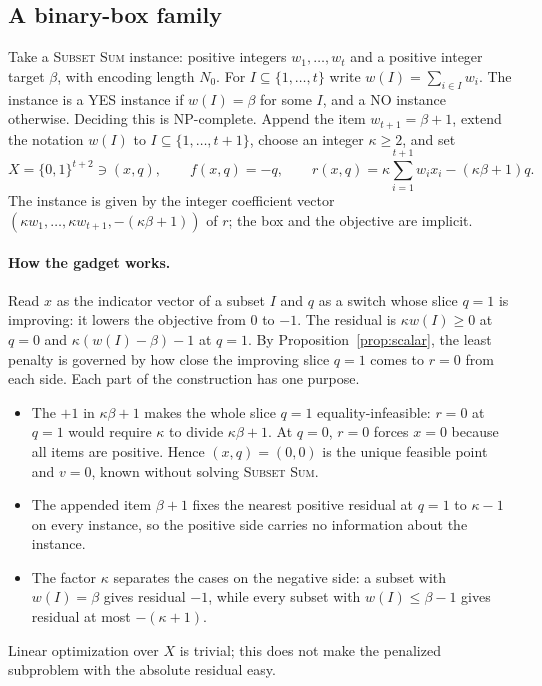 \subsection{A binary-box family}\label{sec:calibration-family}
Take a \textsc{Subset Sum} instance: positive integers $w_1,\ldots,w_t$ and
a positive integer target $\beta$, with encoding length $N_0$. For
$I\subseteq\{1,\ldots,t\}$ write $w(I)=\sum_{i\in I}w_i$. The instance is a
YES instance if $w(I)=\beta$ for some $I$, and a NO instance otherwise.
Deciding this is NP-complete. Append the item $w_{t+1}=\beta+1$, extend the
notation $w(I)$ to $I\subseteq\{1,\ldots,t+1\}$, choose an integer
$\kappa\ge2$, and set
\begin{equation}\label{eq:subsetmodel}
 X=\{0,1\}^{t+2}\ni(x,q),\qquad f(x,q)=-q,\qquad
 r(x,q)=\kappa\sum_{i=1}^{t+1}w_ix_i-(\kappa\beta+1)q.
\end{equation}
The instance is given by the integer coefficient vector
$(\kappa w_1,\ldots,\kappa w_{t+1},-(\kappa\beta+1))$ of $r$; the box and the
objective are implicit.

\paragraph{How the gadget works.}
Read $x$ as the indicator vector of a subset $I$ and $q$ as a switch
whose slice $q=1$ is improving: it lowers the objective from $0$ to $-1$. The residual is
$\kappa w(I)\ge0$ at $q=0$ and $\kappa(w(I)-\beta)-1$ at $q=1$. By
Proposition~\ref{prop:scalar}, the least penalty is governed by how close
the improving slice $q=1$ comes to $r=0$ from each side. Each part of the
construction has one purpose.
\begin{itemize}
 \item The $+1$ in $\kappa\beta+1$ makes the whole slice $q=1$
 equality-infeasible: $r=0$ at $q=1$ would require $\kappa$ to divide
 $\kappa\beta+1$. At $q=0$, $r=0$ forces $x=0$ because all items are
 positive. Hence $(x,q)=(0,0)$ is the unique feasible point and $v=0$,
 known without solving \textsc{Subset Sum}.
 \item The appended item $\beta+1$ fixes the nearest positive residual at
 $q=1$ to $\kappa-1$ on every instance, so the positive side carries no
 information about the instance.
 \item The factor $\kappa$ separates the cases on the negative side: a
 subset with $w(I)=\beta$ gives residual $-1$, while every subset with
 $w(I)\le\beta-1$ gives residual at most $-(\kappa+1)$.
\end{itemize}
Linear optimization over $X$ is trivial; this does not make the penalized
subproblem with the absolute residual easy.

